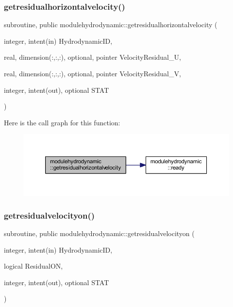 \subsubsection{\texorpdfstring{getresidualhorizontalvelocity()}{getresidualhorizontalvelocity()}}
{\footnotesize\ttfamily subroutine, public modulehydrodynamic\+::getresidualhorizontalvelocity (\begin{DoxyParamCaption}\item[{integer, intent(in)}]{Hydrodynamic\+ID,  }\item[{real, dimension(\+:,\+:,\+:), optional, pointer}]{Velocity\+Residual\+\_\+U,  }\item[{real, dimension(\+:,\+:,\+:), optional, pointer}]{Velocity\+Residual\+\_\+V,  }\item[{integer, intent(out), optional}]{S\+T\+AT }\end{DoxyParamCaption})}

Here is the call graph for this function\+:\nopagebreak
\begin{figure}[H]
\begin{center}
\leavevmode
\includegraphics[width=350pt]{namespacemodulehydrodynamic_a5e97af02320deab67308d99bcf2745e1_cgraph}
\end{center}
\end{figure}
\mbox{\label{namespacemodulehydrodynamic_a987751c28d42e91f65901a19ca158b03}} 
\subsubsection{\texorpdfstring{getresidualvelocityon()}{getresidualvelocityon()}}
{\footnotesize\ttfamily subroutine, public modulehydrodynamic\+::getresidualvelocityon (\begin{DoxyParamCaption}\item[{integer, intent(in)}]{Hydrodynamic\+ID,  }\item[{logical}]{Residual\+ON,  }\item[{integer, intent(out), optional}]{S\+T\+AT }\end{DoxyParamCaption})}

